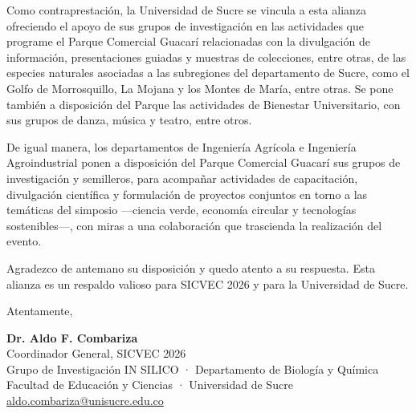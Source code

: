 \documentclass[11pt,a4paper]{article}
\begin{document}
Como contraprestación, la Universidad de Sucre se vincula a esta alianza ofreciendo el apoyo de sus grupos de investigación en las actividades que programe el Parque Comercial Guacarí relacionadas con la divulgación de información, presentaciones guiadas y muestras de colecciones, entre otras, de las especies naturales asociadas a las subregiones del departamento de Sucre, como el Golfo de Morrosquillo, La Mojana y los Montes de María, entre otras. Se pone también a disposición del Parque las actividades de Bienestar Universitario, con sus grupos de danza, música y teatro, entre otros.

De igual manera, los departamentos de Ingeniería Agrícola e Ingeniería Agroindustrial ponen a disposición del Parque Comercial Guacarí sus grupos de investigación y semilleros, para acompañar actividades de capacitación, divulgación científica y formulación de proyectos conjuntos en torno a las temáticas del simposio —ciencia verde, economía circular y tecnologías sostenibles—, con miras a una colaboración que trascienda la realización del evento.

Agradezco de antemano su disposición y quedo atento a su respuesta. Esta alianza es un respaldo valioso para SICVEC 2026 y para la Universidad de Sucre.

\vspace{0.3cm}

Atentamente,

\vspace{0.3cm}

\textbf{Dr. Aldo F. Combariza}\\
Coordinador General, SICVEC 2026\\
Grupo de Investigación IN SILICO · Departamento de Biología y Química\\
Facultad de Educación y Ciencias · Universidad de Sucre\\
\href{mailto:aldo.combariza@unisucre.edu.co}{aldo.combariza@unisucre.edu.co}
\end{document}
